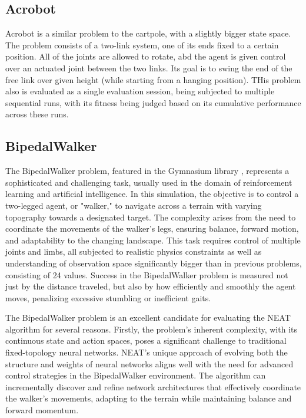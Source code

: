 \documentclass{article}
\begin{document}
        \subsection{Acrobot}
        Acrobot is a similar problem to the cartpole, with a slightly bigger state space. The problem consists
        of a two-link system, one of its ends fixed to a certain position. All of the joints are allowed to rotate,
        abd the agent is given control over an actuated joint between the two links. Its goal is to swing the
        end of the free link over given height (while starting from a hanging position). 
        THis problem also is evaluated as a single evaluation session, being subjected to multiple sequential runs,
        with its fitness being judged based on its cumulative performance across these runs.
        \subsection{BipedalWalker}
        The BipedalWalker problem, featured in the Gymnasium library \cite{gymnasium},
        represents a sophisticated and challenging task, usually used in the domain of reinforcement learning and artificial intelligence.
        In this simulation, the objective is to control a two-legged agent, or "walker," to navigate
        across a terrain with varying topography towards a designated target. The complexity arises from the
        need to coordinate the movements of the walker's legs, ensuring balance, forward motion, and adaptability to the changing landscape.
        This task requires control of multiple joints and limbs, all subjected to realistic physics constraints as well as understanding
        of observation space significantly bigger than in previous problems, consisting of 24 values.
        Success in the BipedalWalker problem is measured not just by the distance traveled,
        but also by how efficiently and smoothly the agent moves, penalizing excessive stumbling or inefficient gaits.

        The BipedalWalker problem is an excellent candidate for evaluating the NEAT
        algorithm for several reasons. Firstly, the problem's inherent complexity, with its continuous state and action spaces,
        poses a significant challenge to traditional fixed-topology neural networks.
        NEAT's unique approach of evolving both the structure and weights of neural networks aligns well with the need 
        for advanced control strategies in the BipedalWalker environment. The algorithm can 
        incrementally discover and refine network architectures that effectively coordinate the walker's
        movements, adapting to the terrain while maintaining balance and forward momentum.
\end{document}

